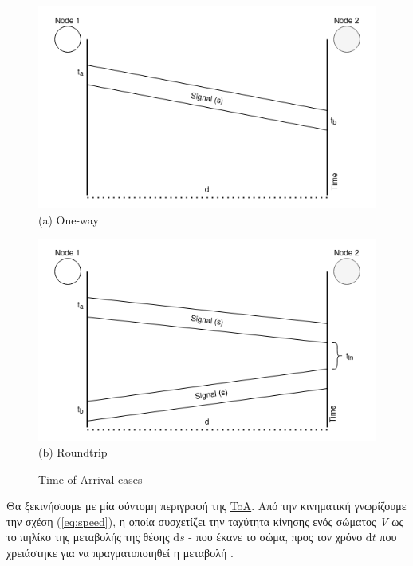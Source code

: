 \begin{figure} [H]
    \centering
    \begin{minipage}{.5\textwidth}
      \centering
      \includegraphics[width=\linewidth]{../Photos/toa-oneway.png}
      {(a) One-way}
    \end{minipage}%
    \begin{minipage}{.5\textwidth}
      \centering
      \includegraphics[width=\linewidth]{../Photos/toa-roundtrip.png}
      {(b) Roundtrip}
    \end{minipage}
    \hfill \break
    \decoRule
    \caption[Time of Arrival cases]{Time of Arrival cases}
    \label{fig:Time-of-Arrival-cases}
\end{figure}

Θα ξεκινήσουμε με μία σύντομη περιγραφή της \hyperref[abbr:ToA]{ToA}. Από την κινηματική γνωρίζουμε την 
σχέση (\ref{eq:speed}), η οποία συσχετίζει την ταχύτητα κίνησης ενός σώματος \emph{V} ως το πηλίκο της μεταβολής
της θέσης $\mathrm{d}s$ - που έκανε το σώμα, προς τον χρόνο $\mathrm{d}t$ που χρειάστηκε για να πραγματοποιηθεί η μεταβολή \cite{Kinematics}.

